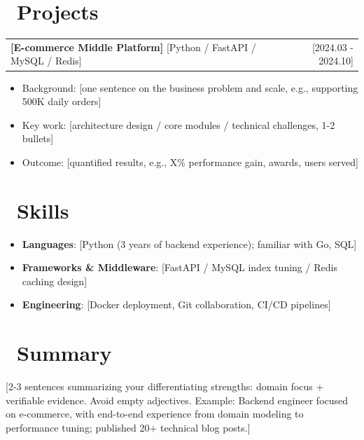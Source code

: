 \documentclass[10.5pt]{article}
\makeatletter
\newcommand{\project}[3]{%
  \begin{tabularx}{\textwidth}{@{}X r@{}}
    \textbf{#1} \; {\small\color{graytext}#2} & {\small\color{graytext}#3} \\
  \end{tabularx}\vspace{-6pt}}
\makeatother
\begin{document}
\section{\faCubes\ Projects}
\project{[E-commerce Middle Platform]}{[Python / FastAPI / MySQL / Redis]}{[2024.03 - 2024.10]}
\begin{itemize}
  \item Background: [one sentence on the business problem and scale, e.g., supporting 500K daily orders]
  \item Key work: [architecture design / core modules / technical challenges, 1-2 bullets]
  \item Outcome: [quantified results, e.g., X\% performance gain, awards, users served]
\end{itemize}

\section{\faCogs\ Skills}
\begin{itemize}
  \item \textbf{Languages}: [Python (3 years of backend experience); familiar with Go, SQL]
  \item \textbf{Frameworks \& Middleware}: [FastAPI / MySQL index tuning / Redis caching design]
  \item \textbf{Engineering}: [Docker deployment, Git collaboration, CI/CD pipelines]
\end{itemize}

\section{\faUser\ Summary}
[2-3 sentences summarizing your differentiating strengths: domain focus + verifiable evidence. Avoid empty adjectives. Example: Backend engineer focused on e-commerce, with end-to-end experience from domain modeling to performance tuning; published 20+ technical blog posts.]
\end{document}
